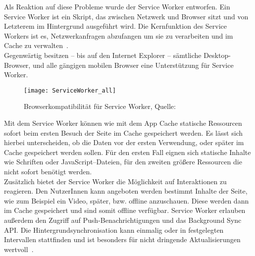 Als Reaktion auf diese Probleme wurde der Service Worker entworfen.
%
%
Ein Service Worker ist ein Skript, das zwischen Netzwerk und Browser sitzt und von Letzterem im Hintergrund ausgeführt wird. Die Kernfunktion des Service Workers ist es, Netzwerkanfragen abzufangen um sie zu verarbeiten und im Cache zu verwalten~\cite{serviceworker}.\\
Gegenwärtig besitzen -- bis auf den Internet Explorer -- sämtliche Desktop-Browser, und alle gängigen mobilen Browser eine Unterstützung für Service Worker.
%
\begin{figure}[H]
	\centering
	\texttt{[image: ServiceWorker\_all]}
	\grayRule
	\caption[Browserkompatibilität für Service Worker]{Browserkompatibilität für Service Worker, Quelle: ~\cite{caniuse-sw}}
	\label{fig:serviceworker}
\end{figure}
%
Mit dem Service Worker können wie mit dem App Cache statische Ressourcen sofort beim ersten Besuch der Seite im Cache gespeichert werden. Es lässt sich hierbei unterscheiden, ob die Daten vor der ersten Verwendung, oder später im Cache gespeichert werden sollen. Für den ersten Fall eignen sich statische Inhalte wie Schriften oder JavaScript--Dateien, für den zweiten größere Ressourcen die nicht sofort benötigt werden.\\
Zusätzlich bietet der Service Worker die Möglichkeit auf Interaktionen zu reagieren. Den NutzerInnen kann angeboten werden bestimmt Inhalte der Seite, wie zum Beispiel ein Video, später, bzw. offline anzuschauen. Diese werden dann im Cache gespeichert und sind somit offline verfügbar.
Service Worker erlauben außerdem den Zugriff auf Push-Benachrichtigungen und das Background Sync \gls{API}. Die Hintergrundsynchronisation kann einmalig oder in festgelegten Intervallen stattfinden und ist besonders für nicht dringende Aktualisierungen wertvoll~\cite{offline_cookbook}.